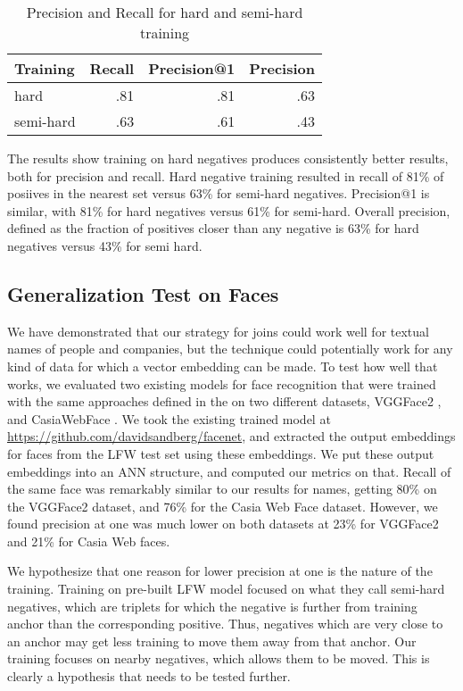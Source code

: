 \begin{table}[ht]
\caption{Precision and Recall for hard and semi-hard training}
\label{hard-semi-hard}
\begin{center}
{\scriptsize
\begin{tabular}{|l|r|r|r|}
\hline
Training & Recall & Precision@1 & Precision \\
\hline
hard & .81 & .81 & .63 \\
\hline
semi-hard & .63 & .61 & .43 \\
\hline
\end{tabular}}
\end{center}
\end{table}

 The results show training on hard negatives produces consistently better results, both for precision and recall.  Hard negative training resulted in recall of 81\% of posiives in the nearest set versus 63\% for semi-hard negatives.  Precision@1 is similar, with 81\% for hard negatives versus 61\% for semi-hard.  Overall precision, defined as the fraction of positives closer than any negative is 63\% for hard negatives versus 43\% for semi hard.

\subsection{Generalization Test on Faces}

 We have demonstrated that our strategy for joins could work well for textual names of people and companies, but the technique could potentially work for any kind of data for which a vector embedding can be made.  To test how well that works, we evaluated two existing models for face recognition that were trained with the same approaches defined in the \cite{DBLP:conf/cvpr/SchroffKP15} on two different datasets, VGGFace2 \cite{DBLP:conf/fgr/CaoSXPZ18}, and CasiaWebFace \cite{DBLP:conf/cvpr/SchroffKP15}.  We took the existing trained model at \url{https://github.com/davidsandberg/facenet}, and extracted the output embeddings for faces from the LFW test set \cite{Huang2012a} using these embeddings.  We put these output embeddings into an ANN structure, and computed our metrics on that.  Recall of the same face was remarkably similar to our results for names, getting 80\% on the VGGFace2 dataset, and 76\% for the Casia Web Face dataset.  However, we found precision at one was much lower on both datasets at 23\% for VGGFace2 and 21\% for Casia Web faces.

We hypothesize that one reason for lower precision at one is the nature of the training.  Training on pre-built LFW model focused on what they call semi-hard negatives, which are triplets for which the negative is further from training anchor than the corresponding positive.  Thus, negatives which are very close to an anchor may get less training to move them away from that anchor.  Our training focuses on nearby negatives, which allows them to be moved.  This is clearly a hypothesis that needs to be tested further.

